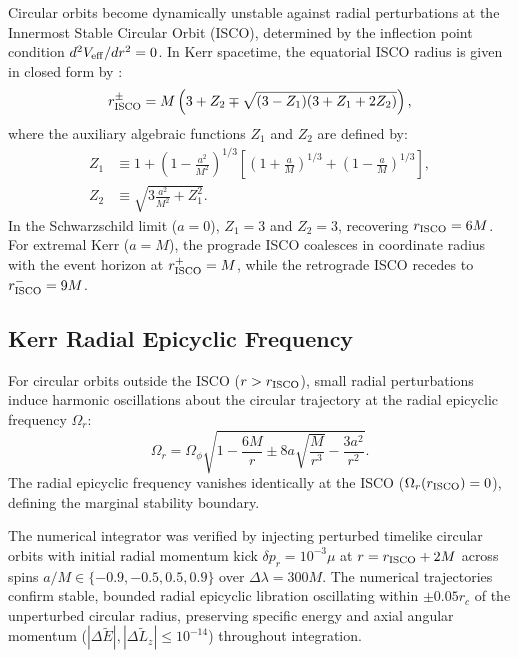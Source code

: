 Circular orbits become dynamically unstable against radial perturbations at the Innermost Stable Circular Orbit (ISCO), determined by the inflection point condition $d^2 V_{\rm eff}/dr^2 = 0$. In Kerr spacetime, the equatorial ISCO radius is given in closed form by \cite{BardeenPressTeukolsky1972}:
\begin{equation}
    r_{\rm ISCO}^\pm = M \left( 3 + Z_2 \mp \sqrt{(3 - Z_1)(3 + Z_1 + 2Z_2)} \right),
    \label{eq:kerr_isco_radii}
\end{equation}
where the auxiliary algebraic functions $Z_1$ and $Z_2$ are defined by:
\begin{align}
    Z_1 &\equiv 1 + \left(1 - \frac{a^2}{M^2}\right)^{1/3} \left[ \left(1 + \frac{a}{M}\right)^{1/3} + \left(1 - \frac{a}{M}\right)^{1/3} \right], \label{eq:def_Z1} \\
    Z_2 &\equiv \sqrt{3\frac{a^2}{M^2} + Z_1^2}. \label{eq:def_Z2}
\end{align}
In the Schwarzschild limit ($a = 0$), $Z_1 = 3$ and $Z_2 = 3$, recovering $r_{\rm ISCO} = 6M$. For extremal Kerr ($a = M$), the prograde ISCO coalesces in coordinate radius with the event horizon at $r_{\rm ISCO}^+ = M$, while the retrograde ISCO recedes to $r_{\rm ISCO}^- = 9M$.

\subsection{Kerr Radial Epicyclic Frequency}
\label{subsec:kerr_epicyclic_freq}
For circular orbits outside the ISCO ($r > r_{\rm ISCO}$), small radial perturbations induce harmonic oscillations about the circular trajectory at the radial epicyclic frequency $\Omega_r$:
\begin{equation}
    \Omega_r = \Omega_\phi \sqrt{1 - \frac{6M}{r} \pm 8a\sqrt{\frac{M}{r^3}} - \frac{3a^2}{r^2}}.
    \label{eq:kerr_epicyclic_freq}
\end{equation}
The radial epicyclic frequency vanishes identically at the ISCO ($\Omega_r(r_{\rm ISCO}) = 0$), defining the marginal stability boundary.

The numerical integrator was verified by injecting perturbed timelike circular orbits with initial radial momentum kick $\delta p_r = 10^{-3}\mu$ at $r = r_{\rm ISCO} + 2M$ across spins $a/M \in \{-0.9, -0.5, 0.5, 0.9\}$ over $\Delta\lambda = 300M$. The numerical trajectories confirm stable, bounded radial epicyclic libration oscillating within $\pm 0.05 r_c$ of the unperturbed circular radius, preserving specific energy and axial angular momentum ($|\Delta\tilde{E}|, |\Delta\tilde{L}_z| \le 10^{-14}$) throughout integration.

